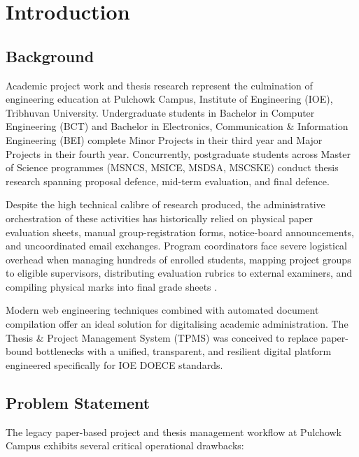\documentclass[12pt]{report}
\begin{document}
\chapter{Introduction}

\section{Background}
Academic project work and thesis research represent the culmination of engineering
education at Pulchowk Campus, Institute of Engineering (IOE), Tribhuvan University.
Undergraduate students in Bachelor in Computer Engineering (BCT) and Bachelor in
Electronics, Communication \& Information Engineering (BEI) complete Minor Projects in
their third year and Major Projects in their fourth year. Concurrently, postgraduate
students across Master of Science programmes (MSNCS, MSICE, MSDSA, MSCSKE) conduct
thesis research spanning proposal defence, mid-term evaluation, and final defence.

Despite the high technical calibre of research produced, the administrative
orchestration of these activities has historically relied on physical paper evaluation
sheets, manual group-registration forms, notice-board announcements, and uncoordinated
email exchanges. Program coordinators face severe logistical overhead when managing
hundreds of enrolled students, mapping project groups to eligible supervisors,
distributing evaluation rubrics to external examiners, and compiling physical marks
into final grade sheets \citep{pressman2014software}.

Modern web engineering techniques combined with automated document compilation offer
an ideal solution for digitalising academic administration. The Thesis \& Project
Management System (TPMS) was conceived to replace paper-bound bottlenecks with a
unified, transparent, and resilient digital platform engineered specifically for
IOE DOECE standards.

\section{Problem Statement}
The legacy paper-based project and thesis management workflow at Pulchowk Campus
exhibits several critical operational drawbacks:
\end{document}
